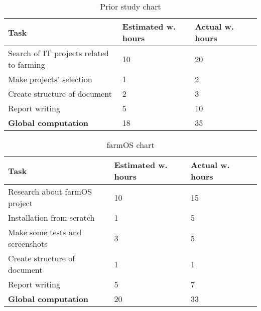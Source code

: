 \begin{table}[H]
\caption{Prior study chart}
\begin{tabular}{llll}
\hline
                               \textbf{Task}    & \textbf{Estimated w. hours} & \textbf{Actual w. hours} \\ \hline
\rowcolor{lightgray}
Search of IT projects related to farming        & 10                          & 20                     \\
Make projects' selection                        & 1                           & 2                      \\
\rowcolor{lightgray}
Create structure of document                    & 2                           & 3                      \\
Report writing                                  & 5                           & 10                     \\
\rowcolor{lightgray}
\textbf{Global computation}                     & 18                          & 35                     \\
\end{tabular}
\end{table}

\begin{table}[H]
\caption{farmOS chart}
\begin{tabular}{llll}
\hline
                               \textbf{Task}    & \textbf{Estimated w. hours} & \textbf{Actual w. hours} \\ \hline
\rowcolor{lightgray}
Research about farmOS project                   & 10                          & 15                     \\
Installation from scratch                       & 1                           & 5                      \\
\rowcolor{lightgray}
Make some tests and screenshots                 & 3                           & 5                      \\
Create structure of document                    & 1                           & 1                      \\
\rowcolor{lightgray}
Report writing                                  & 5                           & 7                     \\
\textbf{Global computation}                     & 20                          & 33                     \\
\end{tabular}
\end{table}

